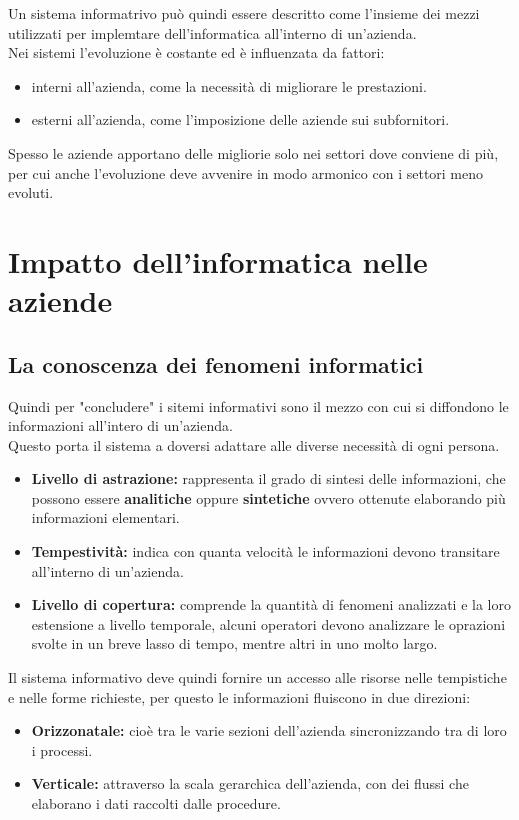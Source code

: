 \documentclass{book}
\begin{document}
    Un sistema informatrivo può quindi essere descritto come l'insieme dei mezzi utilizzati per implemtare dell'informatica all'interno di un'azienda.\\
    Nei sistemi l'evoluzione è costante ed è influenzata da fattori:
    \begin{itemize}
        \item interni all'azienda, come la necessità di migliorare le prestazioni.
        \item esterni all'azienda, come l'imposizione delle aziende sui subfornitori.
    \end{itemize}
    Spesso le aziende apportano delle migliorie solo nei settori dove conviene di più, per cui anche l'evoluzione deve avvenire in modo armonico con i settori meno evoluti.
    
    \section{Impatto dell'informatica nelle aziende}
    \subsection{La conoscenza dei fenomeni informatici}
    Quindi per "concludere" i sitemi informativi sono il mezzo con cui si diffondono le informazioni all'intero di un'azienda.\\
    Questo porta il sistema a doversi adattare alle diverse necessità di ogni persona.
    \begin{itemize}
        \item \textbf{Livello di astrazione:} rappresenta il grado di sintesi delle informazioni, che possono essere \textbf{analitiche} oppure \textbf{sintetiche} ovvero ottenute elaborando più informazioni elementari.
        \item \textbf{Tempestività:} indica con quanta velocità le informazioni devono transitare all'interno di un'azienda.
        \item \textbf{Livello di copertura:} comprende la quantità di fenomeni analizzati e la loro estensione a livello temporale, alcuni operatori devono analizzare le oprazioni svolte in un breve lasso di tempo, mentre altri in uno molto largo. 
    \end{itemize}
    Il sistema informativo deve quindi fornire un accesso alle risorse nelle tempistiche e nelle forme richieste, per questo le informazioni fluiscono in due direzioni:
    \begin{itemize}
        \item \textbf{Orizzonatale:} cioè tra le varie sezioni dell'azienda sincronizzando tra di loro i processi.
        \item \textbf{Verticale:} attraverso la scala gerarchica dell'azienda, con dei flussi che elaborano i dati raccolti dalle procedure.
    \end{itemize}
\end{document}
